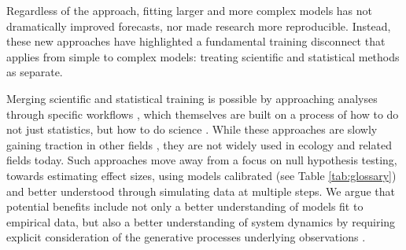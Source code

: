 \documentclass[11pt]{article}
\newcommand{\R}[1]{\label{}\linelabel{#1}}
\begin{document}
Regardless of the approach, fitting larger and more complex models has not dramatically improved forecasts, nor made research more reproducible. Instead, these new approaches have highlighted a fundamental training disconnect that applies from simple to complex models: treating scientific and statistical methods as separate.\R{newintroend}

Merging scientific and statistical training is possible by approaching analyses through specific workflows \citep{betanworkflow,grinsztajn2021,vandeschoot2021}, which themselves are built on a process of how to do not just statistics, but how to do science \citep{box1976science}. While these approaches are slowly gaining traction in other fields \citep[e.g.,][]{esfahani2021bayesian,schad2021,bouman2024bayesian}, they are not widely used in ecology and related fields today. Such approaches move away from a focus on null hypothesis testing, towards estimating effect sizes, using models calibrated (see Table \ref{tab:glossary}) and better understood through simulating data at multiple steps. We argue that potential benefits include not only a better understanding of models fit to empirical data, but also a better understanding of system dynamics by requiring explicit consideration of the generative processes underlying observations \citep{grace2025causal}. %
\end{document}
